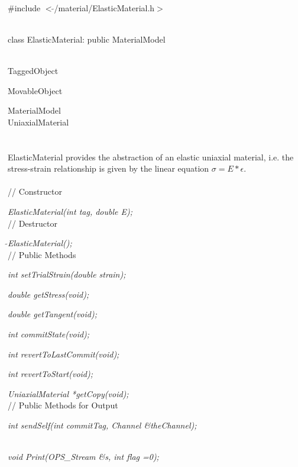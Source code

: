 
   \\
\#include $<\tilde{ }$/material/ElasticMaterial.h$>$  


  \\
class ElasticMaterial: public MaterialModel 


 \\
TaggedObject 

MovableObject 

\indent\indent MaterialModel \\
\indent\indent\indent UniaxialMaterial \\
\indent\indent\indent{} \\

  \\
\indent ElasticMaterial provides the abstraction of an elastic
uniaxial material, i.e. the stress-strain relationship is given by the
linear equation $\sigma = E * \epsilon$. \\

 \\
// Constructor 

{\em ElasticMaterial(int tag, double E);}  \\ 

// Destructor 

{\em $\tilde{ }$ElasticMaterial();}\\ 

// Public Methods 

{\em int setTrialStrain(double strain); } 

{\em double getStress(void); } 

{\em double getTangent(void); } 

{\em int commitState(void); } 

{\em int revertToLastCommit(void); } 

{\em int revertToStart(void); } 

{\em UniaxialMaterial *getCopy(void); } \\ 

// Public Methods for Output

{\em int sendSelf(int commitTag, Channel \&theChannel); }

\\
{\em void Print(OPS_Stream \&s, int flag =0);} 


